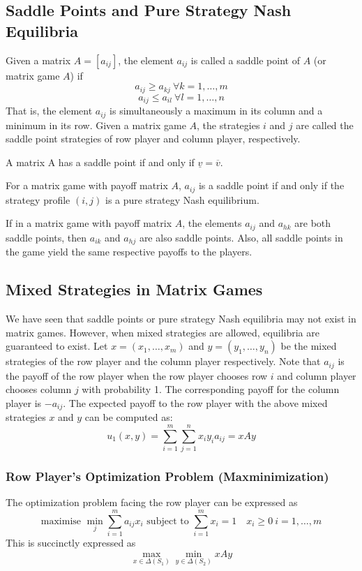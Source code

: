 \subsection{Saddle Points and Pure Strategy Nash Equilibria}
\begin{defn}
	Given a matrix $A = [a_{ij}]$, the element $a_{ij}$ is called a saddle point of $A$ (or matrix game $A$) if
	\[a_{ij}\geq a_{kj}\ \forall k=1,\ldots,m\]
	\[a_{ij}\leq a_{il}\ \forall l=1,\ldots,n\]
	That is, the element $a_{ij}$ is simultaneously a maximum in its column and a minimum in its row.
	Given a matrix game $A$, the strategies $i$ and $j$ are called the saddle point strategies of row player and column player, respectively.
\end{defn}
\begin{theorem}
	A matrix A has a saddle point if and only if $\underline{v} = \overline{v}$.
\end{theorem}
\begin{prop}
	For a matrix game with payoff matrix $A$, $a_{ij}$ is a saddle point if and only if the strategy profile $(i, j)$ is a pure strategy Nash equilibrium.
\end{prop}
\begin{prop}
	If in a matrix game with payoff matrix $A$, the elements $a_{ij}$ and $a_{hk}$ are both saddle points, then $a_{ik}$ and $a_{hj}$ are also saddle points.
	Also, all saddle points in the game yield the same respective payoffs to the players.
\end{prop}
\subsection{Mixed Strategies in Matrix Games}
We have seen that saddle points or pure strategy Nash equilibria may not exist in matrix games.
However, when mixed strategies are allowed, equilibria are guaranteed to exist.
Let $x = (x_1,\ldots, x_m)$ and $y = (y_1,\ldots, y_n)$ be the mixed strategies of the row player and the column player respectively.
Note that $a_{ij}$ is the payoff of the row player when the row player chooses row $i$ and column player chooses column $j$ with probability 1.
The corresponding payoff for the column player is $-a_{ij}$.
The expected payoff to the row player with the above mixed strategies $x$ and $y$ can be computed as:
\[u_1(x,y)=\sum_{i=1}^m \sum_{j=1}^n x_iy_ia_{ij}=xAy\]
\subsubsection{Row Player’s Optimization Problem (Maxminimization)}
The optimization problem facing the row player can be expressed as
\[\text{maximise }\min_{j}\sum_{i=1}^m a_{ij}x_i\text{ subject to }\sum_{i=1}^m x_i=1\quad x_i\geq0\ i=1,\ldots,m\]
This is succinctly expressed as
\[\max_{x\in \Delta(S_1)}\min_{y\in\Delta(S_2)}xAy\]
